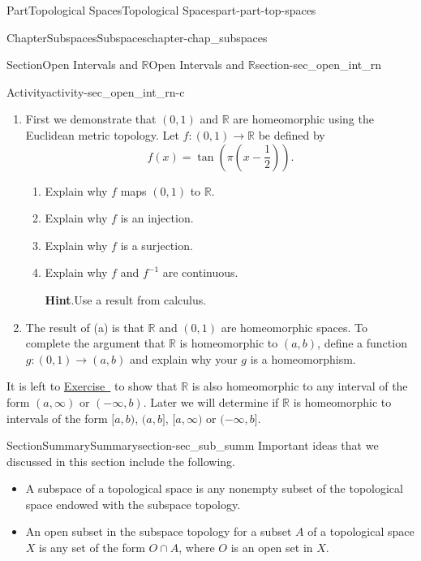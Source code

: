 \documentclass[oneside,10pt,]{book}
\newcommand{\blocktitlefont}{\relax}
\newcommand{\xreffont}{\relax}
\numberwithin{equation}{chapter}
\newcommand{\R}{\mathbb{R}}
\begin{document}
\begin{partptx}{Part}{Topological Spaces}{}{Topological Spaces}{}{}{part-part-top-spaces}
\begin{chapterptx}{Chapter}{Subspaces}{}{Subspaces}{}{}{chapter-chap_subspaces}
\begin{sectionptx}{Section}{Open Intervals and \(\R\)}{}{Open Intervals and \(\R\)}{}{}{section-sec_open_int_rn}
\begin{activity}{Activity}{}{activity-sec_open_int_rn-c}
\begin{enumerate}[font=\bfseries,label=(\alph*),ref=\alph*]%
\item{}First we demonstrate that \((0,1)\) and \(\R\) are homeomorphic using the Euclidean metric topology. Let \(f : (0,1) \to \R\) be defined by%
\begin{equation*}
f(x) = \tan\left(\pi\left(x-\frac{1}{2}\right)\right)\text{.}
\end{equation*}
%
\begin{enumerate}[font=\bfseries,label=(\roman*),ref=\theenumi.\roman*]%
\item{}Explain why \(f\) maps \((0,1)\) to \(\R\).%
\item{}Explain why \(f\) is an injection.%
\item{}Explain why \(f\) is a surjection.%
\item{}Explain why \(f\) and \(f^{-1}\) are continuous.%
\par\smallskip%
\noindent\textbf{\blocktitlefont Hint}.\hypertarget{hint-sec_open_int_rn-c-b-e-b}{}\quad{}Use a result from calculus.%
\end{enumerate}%
\item{}The result of (a) is that \(\R\) and \((0,1)\) are homeomorphic spaces. To complete the argument that \(\R\) is homeomorphic to \((a,b)\), define a function \(g: (0,1) \to (a,b)\) and explain why your \(g\) is a homeomorphism.%
\end{enumerate}%
\end{activity}%
It is left to \hyperlink{exercise-ex_R_intervals}{Exercise~{\xreffont 4}} to show that \(\R\) is also homeomorphic to any interval of the form \((a,\infty)\) or \((-\infty,b)\). Later we will determine if \(\R\) is homeomorphic to intervals of the form \([a,b)\), \((a,b]\), \([a, \infty)\) or \((-\infty, b]\).%
\end{sectionptx}
%
%
\typeout{************************************************}
\typeout{************************************************}
%
\begin{sectionptx}{Section}{Summary}{}{Summary}{}{}{section-sec_sub_summ}
Important ideas that we discussed in this section include the following.%
\begin{itemize}[label=\textbullet]
\item{}A subspace of a topological space is any nonempty subset of the topological space endowed with the subspace topology.%
\item{}An open subset in the subspace topology for a subset \(A\) of a topological space \(X\) is any set of the form \(O \cap A\), where \(O\) is an open set in \(X\).%

\end{itemize}
\end{sectionptx}
\end{chapterptx}
\end{partptx}
\end{document}

